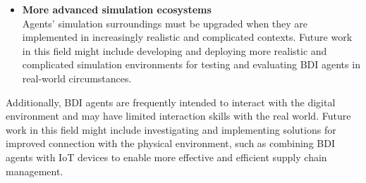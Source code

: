 \begin{itemize}
    \vspace{.5cm}
    
    \item \textbf{More advanced simulation ecosystems} \\ 
    Agents' simulation surroundings must be upgraded when they are implemented in increasingly realistic and complicated contexts. Future work in this field might include developing and deploying more realistic and complicated simulation environments for testing and evaluating \ac{BDI} agents in real-world circumstances.

    \vspace{.5cm}
\end{itemize}
Additionally, \ac{BDI} agents are frequently intended to interact with the digital environment and may have limited interaction skills with the real world. Future work in this field might include investigating and implementing solutions for improved connection with the physical environment, such as combining \ac{BDI} agents with IoT devices to enable more effective and efficient supply chain management.